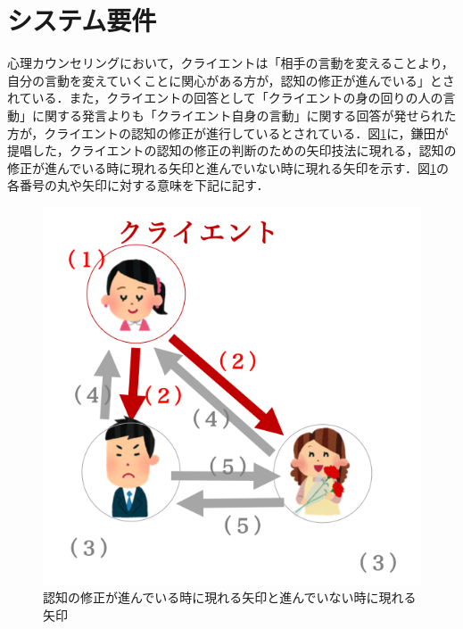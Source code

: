 \documentclass[shuuron]{kuee}
\begin{document}
\section{システム要件}
心理カウンセリングにおいて，クライエントは「相手の言動を変えることより，自分の言動を変えていくことに関心がある方が，認知の修正が進んでいる」\cite{zokad}とされている．また，クライエントの回答として「クライエントの身の回りの人の言動」に関する発言よりも「クライエント自身の言動」に関する回答が発せられた方が，クライエントの認知の修正が進行しているとされている．図\ref{fig:arrow}に，鎌田\cite{鎌田穣2002臨床}が提唱した，クライエントの認知の修正の判断のための矢印技法に現れる，認知の修正が進んでいる時に現れる矢印と進んでいない時に現れる矢印を示す．図\ref{fig:arrow}の各番号の丸や矢印に対する意味を下記に記す．

\begin{figure}
  \begin{center}
    \includegraphics[width=\linewidth]{arrow.png}
  \end{center}
  \caption{認知の修正が進んでいる時に現れる矢印と進んでいない時に現れる矢印}
  \label{fig:arrow}
\end{figure}
\end{document}
